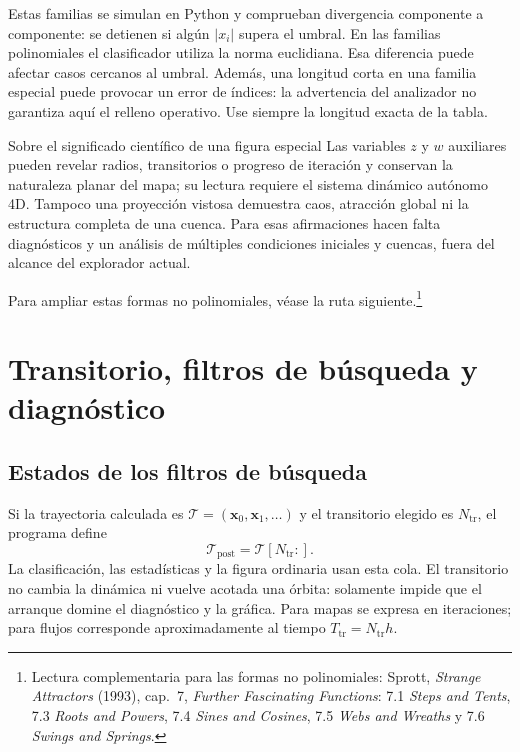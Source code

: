 Estas familias se simulan en Python y comprueban divergencia componente a
componente: se detienen si algún \(|x_i|\) supera el umbral. En las familias
polinomiales el clasificador utiliza la norma euclidiana. Esa diferencia puede
afectar casos cercanos al umbral. Además, una longitud corta en una familia
especial puede provocar un error de índices: la advertencia del analizador no
garantiza aquí el relleno operativo. Use siempre la longitud exacta de la tabla.

\begin{idea}{Sobre el significado científico de una figura especial}
Las variables \(z\) y \(w\) auxiliares pueden revelar radios, transitorios o
progreso de iteración y conservan la naturaleza planar del mapa; su lectura requiere el sistema
dinámico autónomo 4D. Tampoco una proyección vistosa demuestra caos, atracción
global ni la estructura completa de una cuenca. Para esas afirmaciones hacen falta
diagnósticos y un análisis de múltiples condiciones iniciales y cuencas, fuera del
alcance del explorador actual.
\end{idea}

Para ampliar estas formas no polinomiales, véase la ruta siguiente.\footnote{Lectura
complementaria para las formas no polinomiales: Sprott,
\emph{Strange Attractors} (1993), cap.~7, \emph{Further Fascinating Functions}:
7.1 \emph{Steps and Tents}, 7.3 \emph{Roots and Powers}, 7.4
\emph{Sines and Cosines}, 7.5 \emph{Webs and Wreaths} y 7.6
\emph{Swings and Springs}.}

\section{Transitorio, filtros de búsqueda y diagnóstico}

\subsection{Estados de los filtros de búsqueda}

Si la trayectoria calculada es
\(\mathcal{T}=(\mathbf{x}_0,\mathbf{x}_1,\ldots)\) y el transitorio elegido es
\(N_{\mathrm{tr}}\), el programa define
\[
 \mathcal{T}_{\mathrm{post}}=
 \mathcal{T}[N_{\mathrm{tr}}:].
\]
La clasificación, las estadísticas y la figura ordinaria usan esta cola. El
transitorio no cambia la dinámica ni vuelve acotada una órbita: solamente impide
que el arranque domine el diagnóstico y la gráfica. Para mapas se expresa en
iteraciones; para flujos corresponde aproximadamente al tiempo
\(T_{\mathrm{tr}}=N_{\mathrm{tr}}h\).


